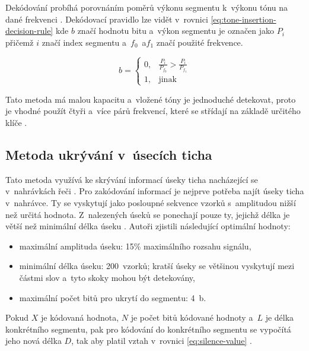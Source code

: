 Dekódování probíhá porovnáním poměrů výkonu segmentu k~výkonu tónu na dané
frekvenci \cite{Djebbar2012}. Dekódovací pravidlo lze vidět v~rovnici
\ref{eq:tone-insertion-decision-rule} kde $b$ značí hodnotu bitu a~výkon
segmentu je označen jako $P_i$ přičemž $i$ značí index segmentu a~$f_0$~a$f_1$
značí použité frekvence.

\begin{equation}
    \label{eq:tone-insertion-decision-rule}
    b = \left\{
        \begin{array}{rl}
            0, & \frac{P_i}{P_{f_0}} > \frac{P_i}{P_{f_1}} \\
            1, & \mathrm{jinak}
        \end{array}
    \right.
\end{equation}

Tato metoda má malou kapacitu a~vložené tóny je jednoduché detekovat, proto je
vhodné použít čtyři a~více párů frekvencí, které se střídají na základě
určitého klíče \cite{Djebbar2012}.

\subsection*{Metoda ukrývání v~úsecích ticha}
\label{sub:hiding-in-silence-intervals}

Tato metoda využívá ke skrývání informací úseky ticha nacházející se
v~nahrávkách řeči \cite{Djebbar2012}. Pro zakódování informací je nejprve
potřeba najít úseky ticha v~nahrávce. Ty se vyskytují jako posloupné sekvence
vzorků s~amplitudou nižší než určitá hodnota. Z~nalezených úseků se ponechají
pouze ty, jejichž délka je větší než minimální délka úseku \cite{Shahreza2008}.
Autoři \cite{Shahreza2008} zjistili následující optimální hodnoty:

\begin{itemize}
    \item maximální amplituda úseku: 15\% maximálního rozsahu signálu,
    \item minimální délka úseku: 200~vzorků; kratší úseky se většinou vyskytují
        mezi částmi slov a~tyto skoky mohou být detekovány,
    \item maximální počet bitů pro ukrytí do segmentu: 4~b.
\end{itemize}

Pokud $X$ je kódovaná hodnota, $N$ je počet bitů kódované hodnoty a~$L$ je
délka konkrétního segmentu, pak pro kódování do konkrétního segmentu se
vypočítá jeho nová délka $D$, tak aby platil vztah v~rovnici
\ref{eq:silence-value} \cite{Shahreza2008}.

